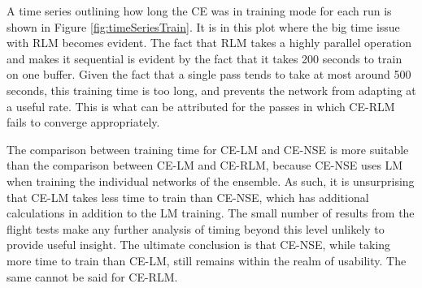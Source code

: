 \clearpage
\par A time series outlining how long the CE was in training mode for each run is shown in Figure \ref{fig:timeSeriesTrain}. It is in this plot where the big time issue with RLM becomes evident. The fact that RLM takes a highly parallel operation and makes it sequential is evident by the fact that it takes 200 seconds to train on one buffer. Given the fact that a single pass tends to take at most around 500 seconds, this training time is too long, and prevents the network from adapting at a useful rate. This is what can be attributed for the passes in which CE-RLM fails to converge appropriately.
\par The comparison between training time for CE-LM and CE-NSE is more suitable than the comparison between CE-LM and CE-RLM, because CE-NSE uses LM when training the individual networks of the ensemble. As such, it is unsurprising that CE-LM takes less time to train than CE-NSE, which has additional calculations in addition to the LM training. The small number of results from the flight tests make any further analysis of timing beyond this level unlikely to provide useful insight. The ultimate conclusion is that CE-NSE, while taking more time to train than CE-LM, still remains within the realm of usability. The same cannot be said for CE-RLM. 

